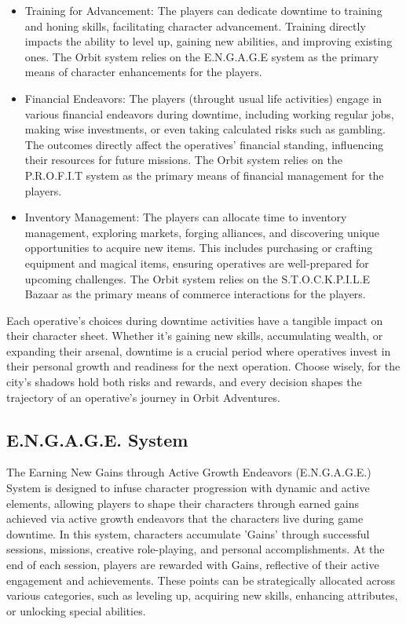 \begin{itemize}
\item Training for Advancement: The players can dedicate downtime to training and honing skills, facilitating character advancement. Training directly impacts the ability to level up, gaining new abilities, and improving existing ones. The Orbit system relies on the E.N.G.A.G.E system as the primary means of character enhancements for the players.

\item Financial Endeavors: The players (throught usual life activities) engage in various financial endeavors during downtime, including working regular jobs, making wise investments, or even taking calculated risks such as gambling. The outcomes directly affect the operatives' financial standing, influencing their resources for future missions. The Orbit system relies on the P.R.O.F.I.T system as the primary means of financial management for the players.

\item Inventory Management: The players can allocate time to inventory management, exploring markets, forging alliances, and discovering unique opportunities to acquire new items. This includes purchasing or crafting equipment and magical items, ensuring operatives are well-prepared for upcoming challenges. The Orbit system relies on the S.T.O.C.K.P.I.L.E Bazaar as the primary means of commerce interactions for the players.
\end{itemize}

Each operative's choices during downtime activities have a tangible impact on their character sheet. Whether it's gaining new skills, accumulating wealth, or expanding their arsenal, downtime is a crucial period where operatives invest in their personal growth and readiness for the next operation. Choose wisely, for the city's shadows hold both risks and rewards, and every decision shapes the trajectory of an operative's journey in Orbit Adventures.


\subsection{E.N.G.A.G.E. System}

The Earning New Gains through Active Growth Endeavors (E.N.G.A.G.E.) System is designed to infuse character progression with dynamic and active elements, allowing players to shape their characters through earned gains achieved via active growth endeavors that the characters live during game downtime. In this system, characters accumulate 'Gains' through successful sessions, missions, creative role-playing, and personal accomplishments. At the end of each session, players are rewarded with Gains, reflective of their active engagement and achievements. These points can be strategically allocated across various categories, such as leveling up, acquiring new skills, enhancing attributes, or unlocking special abilities.


